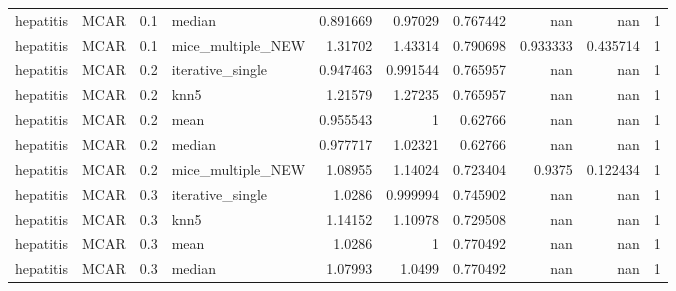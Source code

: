 \begin{table}[ht]
\begin{tabular}{llrlrrrrrr}
 hepatitis       & MCAR        &         0.1 & median            &       0.891669 &             0.97029  &              0.767442  &                       nan        &                    nan         &         1 \\
 hepatitis       & MCAR        &         0.1 & mice\_multiple\_NEW &       1.31702  &             1.43314  &              0.790698  &                         0.933333 &                      0.435714  &         1 \\
 hepatitis       & MCAR        &         0.2 & iterative\_single  &       0.947463 &             0.991544 &              0.765957  &                       nan        &                    nan         &         1 \\
 hepatitis       & MCAR        &         0.2 & knn5              &       1.21579  &             1.27235  &              0.765957  &                       nan        &                    nan         &         1 \\
 hepatitis       & MCAR        &         0.2 & mean              &       0.955543 &             1        &              0.62766   &                       nan        &                    nan         &         1 \\
 hepatitis       & MCAR        &         0.2 & median            &       0.977717 &             1.02321  &              0.62766   &                       nan        &                    nan         &         1 \\
 hepatitis       & MCAR        &         0.2 & mice\_multiple\_NEW &       1.08955  &             1.14024  &              0.723404  &                         0.9375   &                      0.122434  &         1 \\
 hepatitis       & MCAR        &         0.3 & iterative\_single  &       1.0286   &             0.999994 &              0.745902  &                       nan        &                    nan         &         1 \\
 hepatitis       & MCAR        &         0.3 & knn5              &       1.14152  &             1.10978  &              0.729508  &                       nan        &                    nan         &         1 \\
 hepatitis       & MCAR        &         0.3 & mean              &       1.0286   &             1        &              0.770492  &                       nan        &                    nan         &         1 \\
 hepatitis       & MCAR        &         0.3 & median            &       1.07993  &             1.0499   &              0.770492  &                       nan        &                    nan         &         1 \\

\end{tabular}
\end{table}
